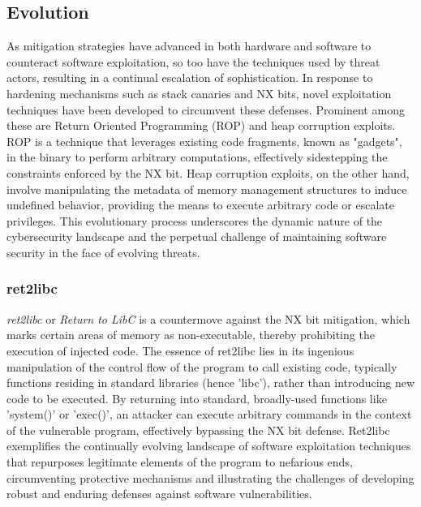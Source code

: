 \documentclass{article}
\begin{document}
\subsection{Evolution}
\begin{comment} ret2libc

  Mention the lack of mitigation
  Rise of heap based exploits due to browsers and JS
  Research some linux&windows kernel exploits
\end{comment}
As mitigation strategies have advanced in both hardware and software to
counteract software exploitation, so too have the techniques used by threat
actors, resulting in a continual escalation of sophistication. In response to
hardening mechanisms such as stack canaries and NX bits, novel exploitation
techniques have been developed to circumvent these defenses. Prominent among
these are Return Oriented Programming (ROP) and heap corruption exploits. ROP is
a technique that leverages existing code fragments, known as "gadgets", in the
binary to perform arbitrary computations, effectively sidestepping the
constraints enforced by the NX bit. Heap corruption exploits, on the other hand,
involve manipulating the metadata of memory management structures to induce
undefined behavior, providing the means to execute arbitrary code or escalate
privileges. This evolutionary process underscores the dynamic nature of the
cybersecurity landscape and the perpetual challenge of maintaining software
security in the face of evolving threats.

\subsubsection{ret2libc}
\emph{ret2libc} or \emph{Return to LibC} is a countermove against the
NX bit mitigation, which marks certain areas of memory as non-executable,
thereby prohibiting the execution of injected code. The essence of ret2libc lies
in its ingenious manipulation of the control flow of the program to call
existing code, typically functions residing in standard libraries (hence
'libc'), rather than introducing new code to be executed. By returning into
standard, broadly-used functions like 'system()' or 'exec()', an attacker can
execute arbitrary commands in the context of the vulnerable program, effectively
bypassing the NX bit defense. Ret2libc exemplifies the continually evolving
landscape of software exploitation techniques that repurposes legitimate elements
of the program to nefarious ends, circumventing protective mechanisms and
illustrating the challenges of
developing robust and enduring defenses against software vulnerabilities.
\end{document}
